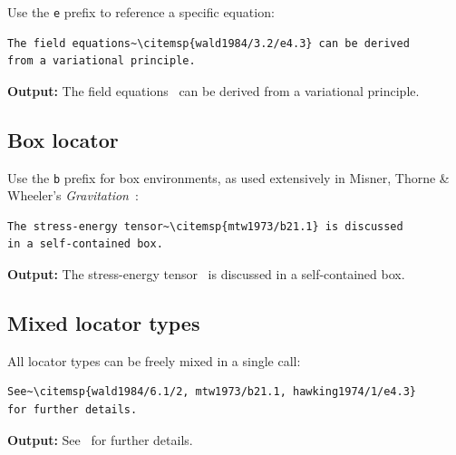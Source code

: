 \documentclass[11pt, a4paper]{article}
\begin{document}
Use the \texttt{e} prefix to reference a specific equation:

\begin{tcolorbox}[colback=blue!3, colframe=blue!30, boxrule=0.5pt, arc=2pt, top=6pt, bottom=6pt, left=10pt, right=10pt]
\begin{verbatim}
The field equations~\citemsp{wald1984/3.2/e4.3} can be derived
from a variational principle.
\end{verbatim}
\end{tcolorbox}

\noindent\textbf{Output:} The field equations~ can be derived from a variational principle.


\subsection{Box locator}

Use the \texttt{b} prefix for box environments, as used extensively in Misner, Thorne \& Wheeler's \textit{Gravitation}~\cite{mtw1973}:

\begin{tcolorbox}[colback=blue!3, colframe=blue!30, boxrule=0.5pt, arc=2pt, top=6pt, bottom=6pt, left=10pt, right=10pt]
\begin{verbatim}
The stress-energy tensor~\citemsp{mtw1973/b21.1} is discussed
in a self-contained box.
\end{verbatim}
\end{tcolorbox}

\noindent\textbf{Output:} The stress-energy tensor~ is discussed in a self-contained box.


\subsection{Mixed locator types}

All locator types can be freely mixed in a single call:

\begin{tcolorbox}[colback=blue!3, colframe=blue!30, boxrule=0.5pt, arc=2pt, top=6pt, bottom=6pt, left=10pt, right=10pt]
\begin{verbatim}
See~\citemsp{wald1984/6.1/2, mtw1973/b21.1, hawking1974/1/e4.3}
for further details.
\end{verbatim}
\end{tcolorbox}

\noindent\textbf{Output:} See~ for further details.
\end{document}
